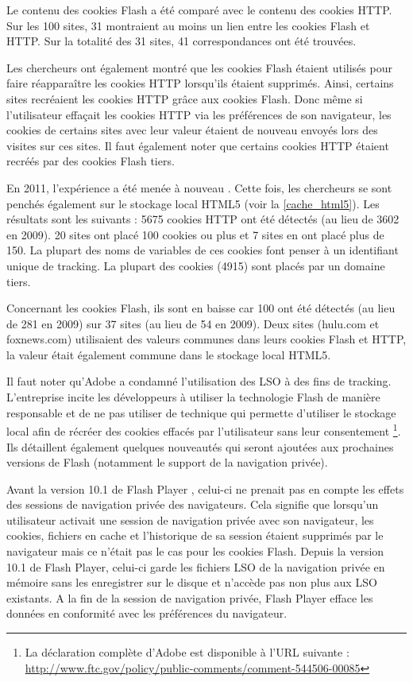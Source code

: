 Le contenu des cookies Flash a été comparé avec le contenu des cookies HTTP. Sur les 100 sites, 31 montraient au moins un lien entre les cookies Flash et HTTP. Sur la totalité des 31 sites, 41 correspondances ont été trouvées.

Les chercheurs ont également montré que les cookies Flash étaient utilisés pour faire réapparaître les cookies HTTP lorsqu'ils étaient supprimés. Ainsi, certains sites recréaient les cookies HTTP grâce aux cookies Flash. Donc même si l'utilisateur effaçait les cookies HTTP via les préférences de son navigateur, les cookies de certains sites avec leur valeur étaient de nouveau envoyés lors des visites sur ces sites. Il faut également noter que certains cookies HTTP étaient recréés par des cookies Flash tiers.
\newline

En 2011, l'expérience a été menée à nouveau \cite{flash_cookies_privacy_2}. Cette fois, les chercheurs se sont penchés également sur le stockage local HTML5 (voir la \autoref{cache_html5}). Les résultats sont les suivants : 5675 cookies HTTP ont été détectés (au lieu de 3602 en 2009). 20 sites ont placé 100 cookies ou plus et 7 sites en ont placé plus de 150. La plupart des noms de variables de ces cookies font penser à un identifiant unique de tracking. La plupart des cookies (4915) sont placés par un domaine tiers.

Concernant les cookies Flash, ils sont en baisse car 100 ont été détectés (au lieu de 281 en 2009) sur 37 sites (au lieu de 54 en 2009).
Deux sites (hulu.com et foxnews.com) utilisaient des valeurs communes dans leurs cookies Flash et HTTP, la valeur était également commune dans le stockage local HTML5.
\newline

Il faut noter qu'Adobe a condamné l'utilisation des LSO à des fins de tracking. L'entreprise incite les développeurs à utiliser la technologie Flash de manière responsable et de ne pas utiliser de technique qui permette d'utiliser le stockage local afin de récréer des cookies effacés par l'utilisateur sans leur consentement \footnote{La déclaration complète d'Adobe est disponible à l'URL suivante : \url{http://www.ftc.gov/policy/public-comments/comment-544506-00085}}. Ils détaillent également quelques nouveautés qui seront ajoutées aux prochaines versions de Flash (notamment le support de la navigation privée).
\newline

Avant la version 10.1 de Flash Player \cite{flash_private}, celui-ci ne prenait pas en compte les effets des sessions de navigation privée des navigateurs. Cela signifie que lorsqu'un utilisateur activait une session de navigation privée avec son navigateur, les cookies, fichiers en cache et l'historique de sa session étaient supprimés par le navigateur mais ce n'était pas le cas pour les cookies Flash. Depuis la version 10.1 de Flash Player, celui-ci garde les fichiers LSO de la navigation privée en mémoire sans les enregistrer sur le disque et n'accède pas non plus aux LSO existants. A la fin de la session de navigation privée, Flash Player efface les données en conformité avec les préférences du navigateur.

